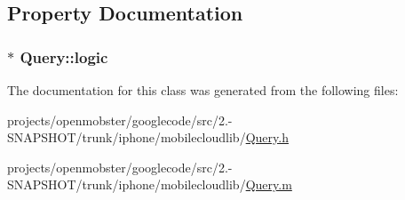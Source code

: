 \subsection{\-Property \-Documentation}
\hypertarget{interface_query_a1e3bd8d36bf4fada56b77376532f1f4f}{
\subsubsection[{logic}]{ $\ast$ \-Query\-::logic}}
\label{interface_query_a1e3bd8d36bf4fada56b77376532f1f4f}


\-The documentation for this class was generated from the following files\-:\begin{DoxyCompactItemize}
\item 
projects/openmobster/googlecode/src/2.-\/\-S\-N\-A\-P\-S\-H\-O\-T/trunk/iphone/mobilecloudlib/\hyperlink{_query_8h}{\-Query.\-h}\item 
projects/openmobster/googlecode/src/2.-\/\-S\-N\-A\-P\-S\-H\-O\-T/trunk/iphone/mobilecloudlib/\hyperlink{_query_8m}{\-Query.\-m}\end{DoxyCompactItemize}

